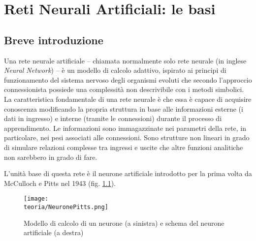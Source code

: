 \chapter{Reti Neurali Artificiali: le basi} %

\label{Capitolo1} %
\def \path {Figures/C1}
\def \teoria {Figures/teoria}


\section{Breve introduzione}
\label{sec:intro}
Una rete neurale artificiale – chiamata normalmente solo rete neurale (in inglese \emph{Neural Network}) – è
un modello di calcolo adattivo, ispirato ai principi di funzionamento del sistema nervoso degli organismi evoluti che secondo l'approccio connessionista\parencite{WConnessionismo} possiede una complessità non descrivibile con i metodi simbolici.  
La caratteristica fondamentale di una rete neurale è che essa è capace di acquisire conoscenza modificando la propria struttura in base alle informazioni esterne (i dati in ingresso) e interne (tramite le connessioni) durante il processo di apprendimento. Le informazioni sono immagazzinate nei parametri della rete, in particolare, nei pesi associati alle connessioni. 
Sono strutture non lineari in grado di simulare relazioni complesse tra
ingressi e uscite che altre funzioni analitiche non sarebbero in grado di fare. 


L'unità base di questa rete è il neurone artificiale introdotto per la prima volta da McCulloch e
Pitts nel 1943 (fig. \ref{fig:neuron}).


\begin{figure}[h!]
 \centering
 \texttt{[image: \\teoria/NeuronePitts.png]}
 \caption{Modello di calcolo di un neurone (a sinistra) e schema del neurone artificiale (a destra)}
 \label{fig:neuron}
\end{figure}

